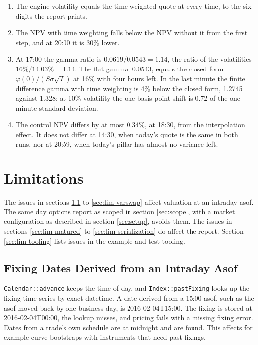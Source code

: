 \documentclass[12pt, a4paper]{article}
\begin{document}
\begin{enumerate}
\item The engine volatility equals the time-weighted quote at every time, to the six digits the report prints.
\item The NPV with time weighting falls below the NPV without it from the first step, and at 20:00 it is 30\% lower.
\item At 17:00 the gamma ratio is $0.0619/0.0543 = 1.14$, the ratio of the volatilities $16\%/14.03\% = 1.14$. The flat
  gamma, 0.0543, equals the closed form $\varphi(0)/(S\sigma\sqrt{T})$ at 16\% with four hours left. In the last minute
  the finite difference gamma with time weighting is 4\% below the closed form, 1.2745 against 1.328: at 10\% volatility the one
  basis point shift is 0.72 of the one minute standard deviation.
\item The control NPV differs by at most 0.34\%, at 18:30, from the interpolation effect. It does not differ at 14:30,
  when today's quote is the same in both runs, nor at 20:59, when today's pillar has almost no variance left.
\end{enumerate}

\section{Limitations}\label{sec:limitations}

The issues in sections \ref{sec:lim-fixingdates} to \ref{sec:lim-varswap} affect valuation at an intraday asof. The
same day options report as scoped in section \ref{sec:scope}, with a market configuration as described in section
\ref{sec:setup}, avoids them. The issues in sections \ref{sec:lim-matured} to \ref{sec:lim-serialization} do affect the
report. Section \ref{sec:lim-tooling} lists issues in the example and test tooling.

\subsection{Fixing Dates Derived from an Intraday Asof}\label{sec:lim-fixingdates}

\texttt{Calendar::advance} keeps the time of day, and \texttt{Index::pastFixing} looks up the fixing time series by
exact datetime. A date derived from a 15:00 asof, such as the asof moved back by one business day, is
2016-02-04T15:00. The fixing is stored at 2016-02-04T00:00, the lookup misses, and pricing fails with a missing fixing
error. Dates from a trade's own schedule are at midnight and are found. This affects for example curve bootstraps with
instruments that need past fixings.
\end{document}
